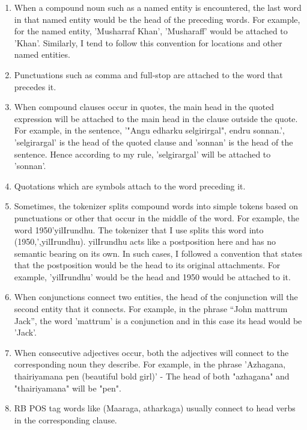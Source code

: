 \documentclass[11pt,letterpaper]{article}
\begin{document}
\begin{enumerate}
 \item When a compound noun such as a named entity is encountered, the last word in that named entity would be the head of the preceding words. For example,
 for the named entity, 'Musharraf Khan', 'Musharaff' would be attached to 'Khan'. Similarly, I tend to follow this convention for locations and other named entities.
 \item Punctuations such as comma and full-stop are attached to the word that precedes it.
 \item When compound clauses occur in quotes, the main head in the quoted expression will be attached to the main head in the clause outside the quote. For example,
 in the sentence, '"Angu edharku selgirirgal", endru sonnan.', 'selgirargal' is the head of the quoted clause and 'sonnan' is the head of the sentence. Hence according
 to my rule, 'selgirargal' will be attached to 'sonnan'.
 \item Quotations which are symbols attach to the word preceding it.
 \item Sometimes, the tokenizer splits compound words into simple tokens based on punctuations or other that occur in the middle of the word. For example, the word 
 1950'yilIrundhu. The tokenizer that I use splits this word into (1950,',yilIrundhu). yilIrundhu acts like a postposition here and has no semantic bearing 
 on its own. In such cases, I followed a convention that states that the postposition would be the head to its original attachments. For example, 'yilIrundhu' would
 be the head and 1950 would be attached to it.
 \item When conjunctions connect two entities, the head of the conjunction will the second entity that it connects. For example, in the phrase ``John mattrum
 Jack'', the word 'mattrum' is a conjunction and in this case its head would be 'Jack'.
 \item When consecutive adjectives occur, both the adjectives will connect to the corresponding noun they describe. For example, in the phrase 'Azhagana, thairiyamana pen (beautiful bold girl)' - The head of both "azhagana" and "thairiyamana" will be "pen".
 \item RB POS tag words like (Maaraga, atharkaga) usually connect to head verbs in the corresponding clause.
 
 
\end{enumerate}
\end{document}
